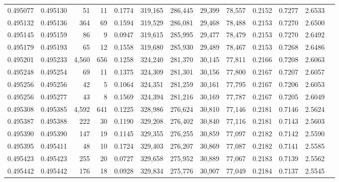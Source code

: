 \begin{tabular}{rrrrrrrrrrrrr}
0.495077 & 0.495130 &    51 &    11 &                                     0.1774 & 319,165 & 286,445 &  29,399 &  78,557 & 0.2152 & 0.7277 & 2.6533 \\
0.495132 & 0.495136 &   364 &    69 &                                     0.1594 & 319,529 & 286,081 &  29,468 &  78,488 & 0.2153 & 0.7270 & 2.6500 \\
0.495145 & 0.495159 &    86 &     9 &                                     0.0947 & 319,615 & 285,995 &  29,477 &  78,479 & 0.2153 & 0.7270 & 2.6492 \\
0.495179 & 0.495193 &    65 &    12 &                                     0.1558 & 319,680 & 285,930 &  29,489 &  78,467 & 0.2153 & 0.7268 & 2.6486 \\
0.495201 & 0.495233 & 4,560 &   656 &                                     0.1258 & 324,240 & 281,370 &  30,145 &  77,811 & 0.2166 & 0.7208 & 2.6063 \\
0.495248 & 0.495254 &    69 &    11 &                                     0.1375 & 324,309 & 281,301 &  30,156 &  77,800 & 0.2167 & 0.7207 & 2.6057 \\
0.495256 & 0.495256 &    42 &     5 &                                     0.1064 & 324,351 & 281,259 &  30,161 &  77,795 & 0.2167 & 0.7206 & 2.6053 \\
0.495256 & 0.495277 &    43 &     8 &                                     0.1569 & 324,394 & 281,216 &  30,169 &  77,787 & 0.2167 & 0.7205 & 2.6049 \\
0.495308 & 0.495385 & 4,592 &   641 &                                     0.1225 & 328,986 & 276,624 &  30,810 &  77,146 & 0.2181 & 0.7146 & 2.5624 \\
0.495387 & 0.495388 &   222 &    30 &                                     0.1190 & 329,208 & 276,402 &  30,840 &  77,116 & 0.2181 & 0.7143 & 2.5603 \\
0.495390 & 0.495390 &   147 &    19 &                                     0.1145 & 329,355 & 276,255 &  30,859 &  77,097 & 0.2182 & 0.7142 & 2.5590 \\
0.495395 & 0.495411 &    48 &    10 &                                     0.1724 & 329,403 & 276,207 &  30,869 &  77,087 & 0.2182 & 0.7141 & 2.5585 \\
0.495423 & 0.495423 &   255 &    20 &                                     0.0727 & 329,658 & 275,952 &  30,889 &  77,067 & 0.2183 & 0.7139 & 2.5562 \\
0.495442 & 0.495442 &   176 &    18 &                                     0.0928 & 329,834 & 275,776 &  30,907 &  77,049 & 0.2184 & 0.7137 & 2.5545 \\

\end{tabular}
